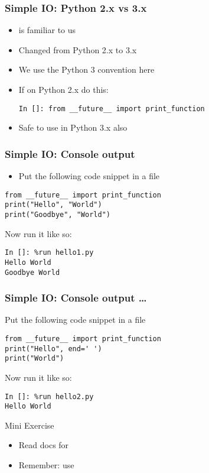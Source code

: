 \documentclass[14pt,compress]{beamer}
\begin{document}
\begin{frame}[fragile]
  \frametitle{Simple IO: Python 2.x vs 3.x}
  \begin{itemize}
  \item {} is familiar to us
  \item Changed from Python 2.x to 3.x
  \item We use the Python 3 convention here
    \vspace*{2em}
  \item If on Python 2.x do this:
  {
    \small
\begin{lstlisting}
In []: from __future__ import print_function
\end{lstlisting}
  }
  \item Safe to use in Python 3.x also
  \end{itemize}
\end{frame}

\begin{frame}[fragile]
  \frametitle{Simple IO: Console output}
  \begin{itemize}
  \item Put the following code snippet in a file 
  \end{itemize}
\begin{lstlisting}
from __future__ import print_function
print("Hello", "World")
print("Goodbye", "World")
\end{lstlisting}
Now run it like so:
\begin{lstlisting}
In []: %run hello1.py
Hello World
Goodbye World
  \end{lstlisting}
\end{frame}

\begin{frame}[fragile]
  \frametitle{Simple IO: Console output \ldots}
Put the following code snippet in a file 
  \begin{lstlisting}
from __future__ import print_function
print("Hello", end=' ')
print("World")
\end{lstlisting}
Now run it like so:
\begin{lstlisting}
In []: %run hello2.py
Hello World
  \end{lstlisting}

\pause

\begin{block}{Mini Exercise}
  \begin{itemize}
  \item Read docs for 
  \item Remember: use  \
  \end{itemize}
\end{block}
\end{frame}
\end{document}
